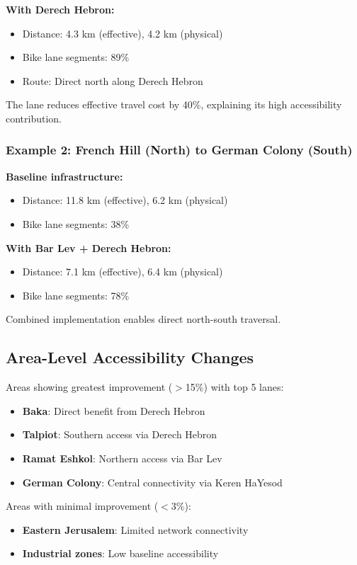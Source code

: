 \documentclass[12pt,a4paper]{article}
\begin{document}
\textbf{With Derech Hebron:}
\begin{itemize}
    \item Distance: 4.3 km (effective), 4.2 km (physical)
    \item Bike lane segments: 89\%
    \item Route: Direct north along Derech Hebron
\end{itemize}

The lane reduces effective travel cost by 40\%, explaining its high accessibility contribution.

\subsubsection{Example 2: French Hill (North) to German Colony (South)}

\textbf{Baseline infrastructure:}
\begin{itemize}
    \item Distance: 11.8 km (effective), 6.2 km (physical)
    \item Bike lane segments: 38\%
\end{itemize}

\textbf{With Bar Lev + Derech Hebron:}
\begin{itemize}
    \item Distance: 7.1 km (effective), 6.4 km (physical)
    \item Bike lane segments: 78\%
\end{itemize}

Combined implementation enables direct north-south traversal.

\subsection{Area-Level Accessibility Changes}

Areas showing greatest improvement ($>$15\%) with top 5 lanes:
\begin{itemize}
    \item \textbf{Baka}: Direct benefit from Derech Hebron
    \item \textbf{Talpiot}: Southern access via Derech Hebron
    \item \textbf{Ramat Eshkol}: Northern access via Bar Lev
    \item \textbf{German Colony}: Central connectivity via Keren HaYesod
\end{itemize}

Areas with minimal improvement ($<$3\%):
\begin{itemize}
    \item \textbf{Eastern Jerusalem}: Limited network connectivity
    \item \textbf{Industrial zones}: Low baseline accessibility
\end{itemize}
\end{document}

